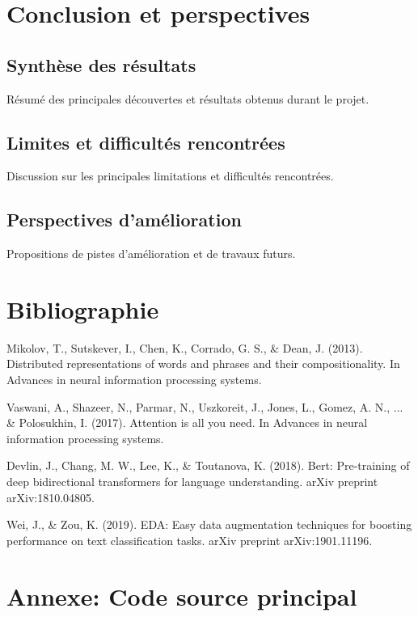 \documentclass[a4paper,11pt]{article}
\begin{document}
\section{Conclusion et perspectives}
\label{sec:conclusion}

\subsection{Synthèse des résultats}
Résumé des principales découvertes et résultats obtenus durant le projet.

\subsection{Limites et difficultés rencontrées}
Discussion sur les principales limitations et difficultés rencontrées.

\subsection{Perspectives d'amélioration}
Propositions de pistes d'amélioration et de travaux futurs.

\section*{Bibliographie}
\begin{thebibliography}{9}
 Mikolov, T., Sutskever, I., Chen, K., Corrado, G. S., \& Dean, J. (2013). Distributed representations of words and phrases and their compositionality. In Advances in neural information processing systems.

 Vaswani, A., Shazeer, N., Parmar, N., Uszkoreit, J., Jones, L., Gomez, A. N., ... \& Polosukhin, I. (2017). Attention is all you need. In Advances in neural information processing systems.

 Devlin, J., Chang, M. W., Lee, K., \& Toutanova, K. (2018). Bert: Pre-training of deep bidirectional transformers for language understanding. arXiv preprint arXiv:1810.04805.

 Wei, J., \& Zou, K. (2019). EDA: Easy data augmentation techniques for boosting performance on text classification tasks. arXiv preprint arXiv:1901.11196.
\end{thebibliography}

\newpage
\appendix
\section{Annexe: Code source principal}
\label{app:code}
\end{document}
